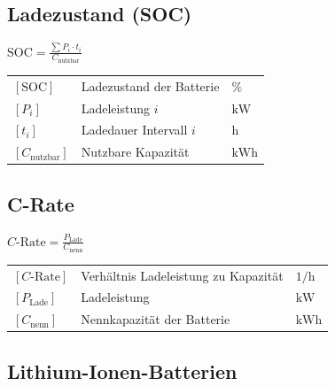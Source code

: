 \subsection{Ladezustand (SOC)}

\begin{minipage}[t]{0.23\columnwidth}
$
\boxed{\text{SOC} = \frac{\sum P_i \cdot t_i}{C_{\text{nutzbar}}}}
$
\end{minipage}
\hfill
\begin{minipage}[t]{0.73\columnwidth}
    \renewcommand{\arraystretch}{1.2}
\begin{tabular}{@{} l p{4.5cm} l @{}}
    $[\text{SOC}]$         & Ladezustand der  Batterie \dotfill           & $\mathrm{\%}$ \\
    $[P_i]$                & Ladeleistung $i$ \dotfill      & $\mathrm{kW}$ \\
    $[t_i]$                 & Ladedauer Intervall $i$ \dotfill       & $\mathrm{h}$ \\
    $[C_{\text{nutzbar}}]$    & Nutzbare Kapazität \dotfill                 & $\mathrm{kWh}$ \\
\end{tabular}
\end{minipage}



\subsection{C-Rate}

\begin{minipage}[t]{0.23\columnwidth}
$
\boxed{C\text{-Rate} = \frac{P_{\text{Lade}}}{C_{\text{nenn}}}}
$
\end{minipage}
\hfill
\begin{minipage}[t]{0.73\columnwidth}
    \renewcommand{\arraystretch}{1.2}
\begin{tabular}{@{} l p{4.5cm} l @{}}
    $[C\text{-Rate}]$      & Verhältnis Ladeleistung zu Kapazität \dotfill & $\mathrm{1/h}$ \\
    $[P_{\text{Lade}}]$    & Ladeleistung \dotfill                         & $\mathrm{kW}$ \\
    $[C_{\text{nenn}}]$    & Nennkapazität der Batterie \dotfill           & $\mathrm{kWh}$ \\
\end{tabular}
\end{minipage}



\subsection{Lithium-Ionen-Batterien}

